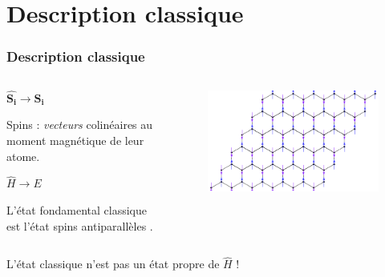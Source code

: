 \documentclass[10pt,a4paper]{beamer}
\newcommand{\h}{\ensuremath{\hat{H}}\xspace}
\newcommand{\1}{\ensuremath{\ket{\om_1\bom_1}}\xspace}
\newcommand{\2}{\ensuremath{\ket{\om_2\bom_2}}\xspace}
\begin{document}
\section{Description classique}
\begin{frame}
\frametitle{Description classique}

\begin{columns}[t]
  \begin{column}{5cm}
  \begin{center}
$\hat{\mathbf{S_i}} \rightarrow \mathbf{S_i}$
\end{center}
Spins : \emph{vecteurs} colinéaires au moment magnétique de leur atome.

\begin{center}
$\h \rightarrow E$
\end{center}

L'état fondamental classique est l'état \og spins antiparallèles \fg{}.

  \end{column}
  
  \begin{column}{5cm}
  \begin{figure}[htp]
	\centering
	\includegraphics[scale=0.60]{vector_img/spins_struc_nid_abeilles.pdf}
	\end{figure} 
  \end{column}
 \end{columns}

\begin{columns}
\begin{column}{5cm}
\begin{alertblock}{}
L'état classique n'est pas un état propre de $\h$ !
\end{alertblock}
\end{column}
\end{columns}

\end{frame}
\end{document}
